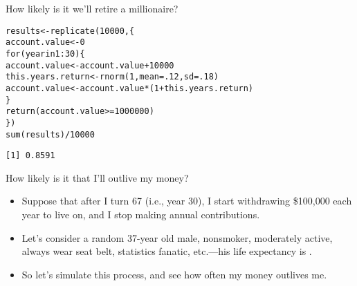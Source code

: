 \documentclass{beamer}\usepackage[]{graphicx}\usepackage[]{color}
\makeatletter
\newcommand{\hlnum}[1]{\textcolor[rgb]{0.824,0.412,0.118}{#1}}%
\newcommand{\hlopt}[1]{\textcolor[rgb]{1,0.894,0.769}{#1}}%
\newcommand{\hlstd}[1]{\textcolor[rgb]{1,0.894,0.769}{#1}}%
\newcommand{\hlkwa}[1]{\textcolor[rgb]{0.941,0.902,0.549}{#1}}%
\newcommand{\hlkwb}[1]{\textcolor[rgb]{0.804,0.776,0.451}{#1}}%
\newcommand{\hlkwc}[1]{\textcolor[rgb]{0.78,0.941,0.545}{#1}}%
\newcommand{\hlkwd}[1]{\textcolor[rgb]{1,0.78,0.769}{#1}}%
\newenvironment{kframe}{%
 \def\at@end@of@kframe{}%
 \ifinner\ifhmode%
  \def\at@end@of@kframe{\end{minipage}}%
  \begin{minipage}{\columnwidth}%
 \fi\fi%
 \def\FrameCommand##1{\hskip\@totalleftmargin \hskip-\fboxsep
 \colorbox{shadecolor}{##1}\hskip-\fboxsep
     \hskip-\linewidth \hskip-\@totalleftmargin \hskip\columnwidth}%
 \MakeFramed {\advance\hsize-\width
   \@totalleftmargin\z@ \linewidth\hsize
   \@setminipage}}%
 {\par\unskip\endMakeFramed%
 \at@end@of@kframe}
\newenvironment{knitrout}{}{} %
\makeatother
\begin{document}
\begin{darkframes}
    \begin{frame}[fragile]{How likely is it we'll retire a millionaire?}
      \fontsize{9}{9}\selectfont
\begin{knitrout}
\begin{kframe}
\begin{alltt}
\hlstd{results} \hlkwb{<-} \hlkwd{replicate}\hlstd{(}\hlnum{10000}\hlstd{, \{}
  \hlstd{account.value} \hlkwb{<-} \hlnum{0}
  \hlkwa{for} \hlstd{(year} \hlkwa{in} \hlnum{1}\hlopt{:}\hlnum{30}\hlstd{) \{}
    \hlstd{account.value} \hlkwb{<-} \hlstd{account.value} \hlopt{+} \hlnum{10000}
    \hlstd{this.years.return} \hlkwb{<-} \hlkwd{rnorm}\hlstd{(}\hlnum{1}\hlstd{,} \hlkwc{mean}\hlstd{=}\hlnum{.12}\hlstd{,} \hlkwc{sd}\hlstd{=}\hlnum{.18}\hlstd{)}
    \hlstd{account.value} \hlkwb{<-} \hlstd{account.value} \hlopt{*} \hlstd{(}\hlnum{1} \hlopt{+} \hlstd{this.years.return)}
  \hlstd{\}}
  \hlkwd{return}\hlstd{(account.value} \hlopt{>=} \hlnum{1000000}\hlstd{)}
\hlstd{\})}
\hlkwd{sum}\hlstd{(results)} \hlopt{/} \hlnum{10000}
\end{alltt}
\begin{verbatim}
[1] 0.8591
\end{verbatim}
\end{kframe}
\end{knitrout}
    \end{frame}

    \begin{frame}{How likely is it that I'll outlive my money?}
      \begin{itemize}[<+->]
        \item Suppose that after I turn 67 (i.e., year 30), I start withdrawing \$100,000 each year to live on, and I stop making annual contributions.
        \item Let's consider a random 37-year old male, nonsmoker, moderately active, always wear seat belt, statistics fanatic, etc.---his life expectancy is .
        \item So let's simulate this process, and see how often my money outlives me.
      \end{itemize}
    \end{frame}


\end{darkframes}
\end{document}
